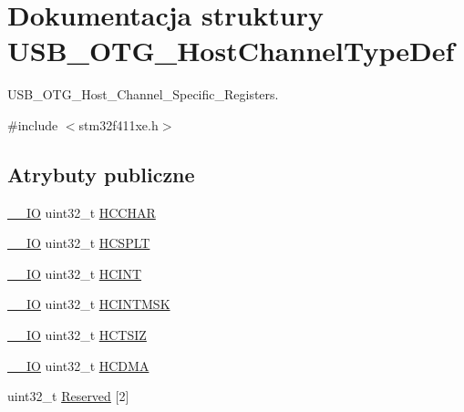 \hypertarget{struct_u_s_b___o_t_g___host_channel_type_def}{}\section{Dokumentacja struktury U\+S\+B\+\_\+\+O\+T\+G\+\_\+\+Host\+Channel\+Type\+Def}
\label{struct_u_s_b___o_t_g___host_channel_type_def}


U\+S\+B\+\_\+\+O\+T\+G\+\_\+\+Host\+\_\+\+Channel\+\_\+\+Specific\+\_\+\+Registers.  




{\ttfamily \#include $<$stm32f411xe.\+h$>$}

\subsection*{Atrybuty publiczne}
\begin{DoxyCompactItemize}
\item 
\hyperlink{core__sc300_8h_aec43007d9998a0a0e01faede4133d6be}{\+\_\+\+\_\+\+IO} uint32\+\_\+t \hyperlink{struct_u_s_b___o_t_g___host_channel_type_def_a6f1e046a654010fb0da5eec942fb9a8d}{H\+C\+C\+H\+AR}
\item 
\hyperlink{core__sc300_8h_aec43007d9998a0a0e01faede4133d6be}{\+\_\+\+\_\+\+IO} uint32\+\_\+t \hyperlink{struct_u_s_b___o_t_g___host_channel_type_def_a23b3abb27cf5acff0edc709c90e2e5cb}{H\+C\+S\+P\+LT}
\item 
\hyperlink{core__sc300_8h_aec43007d9998a0a0e01faede4133d6be}{\+\_\+\+\_\+\+IO} uint32\+\_\+t \hyperlink{struct_u_s_b___o_t_g___host_channel_type_def_a6735bbd8fbc28f897f1b44df95f52873}{H\+C\+I\+NT}
\item 
\hyperlink{core__sc300_8h_aec43007d9998a0a0e01faede4133d6be}{\+\_\+\+\_\+\+IO} uint32\+\_\+t \hyperlink{struct_u_s_b___o_t_g___host_channel_type_def_a8edfae19390d323525449d2444e93984}{H\+C\+I\+N\+T\+M\+SK}
\item 
\hyperlink{core__sc300_8h_aec43007d9998a0a0e01faede4133d6be}{\+\_\+\+\_\+\+IO} uint32\+\_\+t \hyperlink{struct_u_s_b___o_t_g___host_channel_type_def_a14cb8c8dbbafdef182c82c0493ca48ab}{H\+C\+T\+S\+IZ}
\item 
\hyperlink{core__sc300_8h_aec43007d9998a0a0e01faede4133d6be}{\+\_\+\+\_\+\+IO} uint32\+\_\+t \hyperlink{struct_u_s_b___o_t_g___host_channel_type_def_a4204a2dcbc14fb11d371fc45b9f3170f}{H\+C\+D\+MA}
\item 
uint32\+\_\+t \hyperlink{struct_u_s_b___o_t_g___host_channel_type_def_aa85d014d19b79d61bed7fdf134ed1037}{Reserved} \mbox{[}2\mbox{]}
\end{DoxyCompactItemize}


